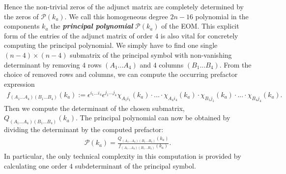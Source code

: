 Hence the non-trivial zeros of the adjunct matrix are completely determined by the zeros of $\mathcal{P}(k_a)$. We call this homogeneous degree $2n-16$ polynomial in the components $k_a$ the \textit{\textbf{principal polynomial}} $\mathcal{P}(k_a)$ of the EOM.
This explicit form of the entries of the adjunct matrix of order $4$ is also vital for concretely computing the principal polynomial. We simply have to find one single $(n-4) \times (n-4)$ submatrix of the principal symbol with non-vanishing determinant by removing $4$ rows $(A_1...A_4)$ and $4$ columns $(B_1...B_4)$. From the choice of removed rows and columns, we can compute the occurring prefactor expression 
\begin{align}\label{prefacF}
f_{(A_1...A_4)(B_1...B_4)}(k_a) := \epsilon^{i_1...i_4} \epsilon^{j_1...j_4} \chi_{A_1i_1}(k_a) \cdot ... \cdot \chi_{A_4i_4}(k_a) \cdot \chi_{B_1j_1}(k_a) \cdot ... \cdot \chi_{B_4j_4}(k_a).
\end{align}
Then we compute the determinant of the chosen submatrix, $Q_{(A_1...A_4)(B_1...B_4)}(k_a)$. The principal polynomial can now be obtained by dividing the determinant by the computed prefactor:
\begin{align}
    \mathcal{P}(k_a) = \frac{Q_{(A_1...A_4)(B_1...B_4)}(k_a)}{f_{(A_1...A_4)(B_1...B_4)}(k_a)}.
\end{align}
In particular, the only technical complexity in this computation is provided by calculating one order $4$ subdeterminant of the principal symbol. 

